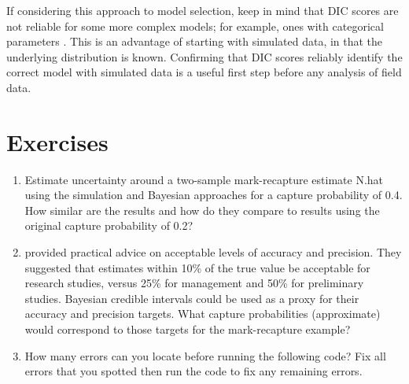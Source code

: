 \documentclass[
]{krantz}
\begin{document}
If considering this approach to model selection, keep in mind that DIC scores are not reliable for some more complex models; for example, ones with categorical parameters \citep{lunn.etal2009}. This is an advantage of starting with simulated data, in that the underlying distribution is known. Confirming that DIC scores reliably identify the correct model with simulated data is a useful first step before any analysis of field data.

\hypertarget{exercises-1}{%
\section{Exercises}\label{exercises-1}}

\begin{enumerate}
\def\labelenumi{\arabic{enumi}.}
\item
  Estimate uncertainty around a two-sample mark-recapture estimate N.hat using the simulation and Bayesian approaches for a capture probability of 0.4. How similar are the results and how do they compare to results using the original capture probability of 0.2?
\item
  \citet{robson.regier1964} provided practical advice on acceptable levels of accuracy and precision. They suggested that estimates within 10\% of the true value be acceptable for research studies, versus 25\% for management and 50\% for preliminary studies. Bayesian credible intervals could be used as a proxy for their accuracy and precision targets. What capture probabilities (approximate) would correspond to those targets for the mark-recapture example?
\item
  How many errors can you locate before running the following code? Fix all errors that you spotted then run the code to fix any remaining errors.
\end{enumerate}
\end{document}
